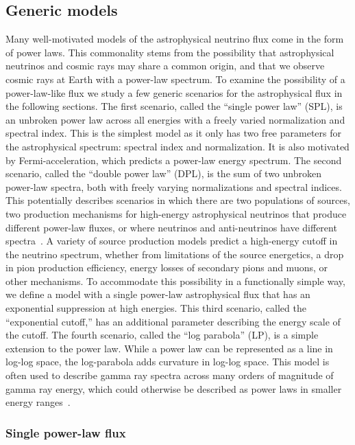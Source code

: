 \subsection{Generic models\label{sec:generic_models}}

Many well-motivated models of the astrophysical neutrino flux come in the form of power laws.
This commonality stems from the possibility that astrophysical neutrinos and cosmic rays may share a common origin, and that we observe cosmic rays at Earth with a power-law spectrum.
To examine the possibility of a power-law-like flux we study a few generic scenarios for the astrophysical flux in the following sections.
The first scenario, called the ``single power law'' (SPL), is an unbroken power law across all energies with a freely varied normalization and spectral index.
This is the simplest model as it only has two free parameters for the astrophysical spectrum: spectral index and normalization.
It is also motivated by Fermi-acceleration, which predicts a power-law energy spectrum.
The second scenario, called the ``double power law'' (DPL), is the sum of two unbroken power-law spectra, both with freely varying normalizations and spectral indices.
This potentially describes scenarios in which there are two populations of sources, two production mechanisms for high-energy astrophysical neutrinos that produce different power-law fluxes, or where neutrinos and anti-neutrinos have different spectra~\cite{Nunokawa:2016pop,Shoemaker:2015qul}.
A variety of source production models predict a high-energy cutoff in the neutrino spectrum, whether from limitations of the source energetics, a drop in pion production efficiency, energy losses of secondary pions and muons, or other mechanisms.
To accommodate this possibility in a functionally simple way, we define a model with a single power-law astrophysical flux that has an exponential suppression at high energies.
This third scenario, called the ``exponential cutoff,'' has an additional parameter describing the energy scale of the cutoff.
The fourth scenario, called the ``log parabola'' (LP), is a simple extension to the power law.
While a power law can be represented as a line in log-log space, the log-parabola adds curvature in log-log space.
This model is often used to describe gamma ray spectra across many orders of magnitude of gamma ray energy, which could otherwise be described as power laws in smaller energy ranges~\cite{TheFermi-LAT:2017pvy}.

\subsubsection{Single power-law flux\label{sec:spl}}

